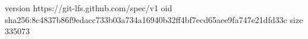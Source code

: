 version https://git-lfs.github.com/spec/v1
oid sha256:8c4837b86f9edacc733b03a734a16940b32ff4bf7ecd65aee9fa747e21dfd33c
size 335073
